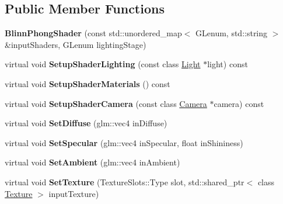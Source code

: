 \subsection*{Public Member Functions}
\begin{DoxyCompactItemize}
\item 
\hypertarget{class_blinn_phong_shader_a2a13c983ffcc8d95ffe1a431bb2b1fb6}{}{\bfseries Blinn\+Phong\+Shader} (const std\+::unordered\+\_\+map$<$ G\+Lenum, std\+::string $>$ \&input\+Shaders, G\+Lenum lighting\+Stage)\label{class_blinn_phong_shader_a2a13c983ffcc8d95ffe1a431bb2b1fb6}

\item 
\hypertarget{class_blinn_phong_shader_a9e4a7358ce59f7fa77ed872eb15eabe7}{}virtual void {\bfseries Setup\+Shader\+Lighting} (const class \hyperlink{class_light}{Light} $\ast$light) const \label{class_blinn_phong_shader_a9e4a7358ce59f7fa77ed872eb15eabe7}

\item 
\hypertarget{class_blinn_phong_shader_ade1dfa6ceb0b2650b2ca3b849ee875ac}{}virtual void {\bfseries Setup\+Shader\+Materials} () const \label{class_blinn_phong_shader_ade1dfa6ceb0b2650b2ca3b849ee875ac}

\item 
\hypertarget{class_blinn_phong_shader_a0e3e2e1d5981f173a72e82d0ef4d643d}{}virtual void {\bfseries Setup\+Shader\+Camera} (const class \hyperlink{class_camera}{Camera} $\ast$camera) const \label{class_blinn_phong_shader_a0e3e2e1d5981f173a72e82d0ef4d643d}

\item 
\hypertarget{class_blinn_phong_shader_a610957f435f1ef817e7d2c4350e55181}{}virtual void {\bfseries Set\+Diffuse} (glm\+::vec4 in\+Diffuse)\label{class_blinn_phong_shader_a610957f435f1ef817e7d2c4350e55181}

\item 
\hypertarget{class_blinn_phong_shader_a6567423da36050cc1567919707e8be72}{}virtual void {\bfseries Set\+Specular} (glm\+::vec4 in\+Specular, float in\+Shininess)\label{class_blinn_phong_shader_a6567423da36050cc1567919707e8be72}

\item 
\hypertarget{class_blinn_phong_shader_a0f8c1c478525dd662922597ea7d9c4ac}{}virtual void {\bfseries Set\+Ambient} (glm\+::vec4 in\+Ambient)\label{class_blinn_phong_shader_a0f8c1c478525dd662922597ea7d9c4ac}

\item 
\hypertarget{class_blinn_phong_shader_aa9c8908b300ce1451887945fb961d3b2}{}virtual void {\bfseries Set\+Texture} (Texture\+Slots\+::\+Type slot, std\+::shared\+\_\+ptr$<$ class \hyperlink{class_texture}{Texture} $>$ input\+Texture)\label{class_blinn_phong_shader_aa9c8908b300ce1451887945fb961d3b2}

\end{DoxyCompactItemize}
